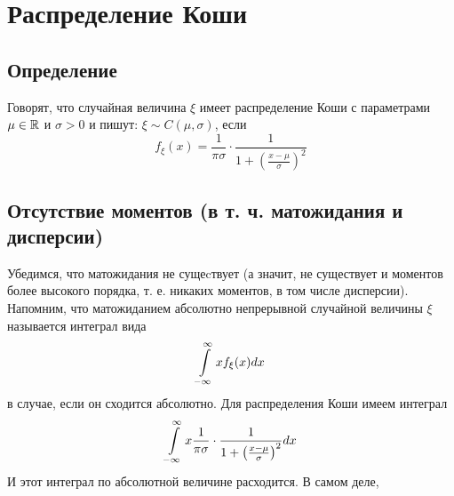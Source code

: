 \section{Распределение Коши}

\subsection{Определение}
Говорят, что случайная величина $\xi$ имеет распределение Коши с параметрами $\mu\in\mathbb{R}$ и $\sigma>0$ и пишут: $\xi\sim C(\mu,\sigma)$, если
\begin{equation}
f_\xi (x) = \frac{1}{\pi\sigma}\cdot \frac{1}{1+ \left( \frac{x-\mu}{\sigma} \right)  ^2}
\end{equation}

\subsection{Отсутствие моментов (в т. ч. матожидания и дисперсии)}
Убедимся, что матожидания не сущеcтвует (а значит, не существует и моментов более высокого порядка, т. е. никаких моментов, в том числе дисперсии).
Напомним, что матожиданием абсолютно непрерывной случайной величины $\xi$ называется интеграл вида
\begin{equation}
 \int\limits_{-\infty }^{\infty } x f_\xi (x) dx
\end{equation}
в случае, если он сходится абсолютно.
Для распределения Коши имеем интеграл
\begin{equation}\label{matozhidanie_Koshi}
 \int\limits_{-\infty }^{\infty } x \frac{1}{\pi\sigma}\cdot \frac{1}{1+ \left( \frac{x-\mu}{\sigma} \right)  ^2} dx
\end{equation}
И этот интеграл по абсолютной величине расходится.
В самом деле,
